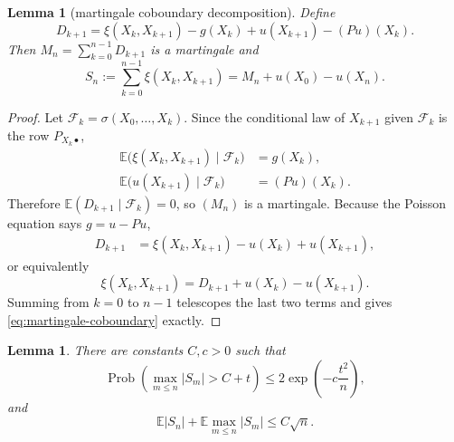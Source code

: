 \documentclass[11pt,a4paper]{amsart}
\newtheorem{lemma}[theorem]{Lemma}
\theoremstyle{definition}
\theoremstyle{remark}
\numberwithin{equation}{section}
\newcommand{\EE}{\mathbb E}
\newcommand{\Prob}{\operatorname{Prob}}
\newcommand{\1}{\boldsymbol 1}
\begin{document}
%
\begin{lemma}[martingale coboundary decomposition]
\label{lem:martingale-coboundary}
Define
\begin{equation}\label{eq:martingale-difference}
 D_{k+1}=\xi(X_k,X_{k+1})-g(X_k)
 +u(X_{k+1})-(Pu)(X_k).
\end{equation}
Then $M_n=\sum_{k=0}^{n-1}D_{k+1}$ is a martingale and
\begin{equation}\label{eq:martingale-coboundary}
 S_n:=\sum_{k=0}^{n-1}\xi(X_k,X_{k+1})
 =M_n+u(X_0)-u(X_n).
\end{equation}
\end{lemma}

\begin{proof}
Let $\mathcal F_k=\sigma(X_0,\ldots,X_k)$.  Since the conditional law
of $X_{k+1}$ given $\mathcal F_k$ is the row
$P_{X_k\bullet}$,
\begin{align*}
 \EE\bigl(\xi(X_k,X_{k+1})\mid\mathcal F_k\bigr)&=g(X_k),\\
 \EE\bigl(u(X_{k+1})\mid\mathcal F_k\bigr)&=(Pu)(X_k).
\end{align*}
Therefore $\EE(D_{k+1}\mid\mathcal F_k)=0$, so $(M_n)$ is a
martingale.  Because the Poisson equation says $g=u-Pu$,
\begin{align*}
 D_{k+1}
 &=\xi(X_k,X_{k+1})-u(X_k)+u(X_{k+1}),
\end{align*}
or equivalently
$$
 \xi(X_k,X_{k+1})
 =D_{k+1}+u(X_k)-u(X_{k+1}).
$$
Summing from $k=0$ to $n-1$ telescopes the last two terms and gives
\eqref{eq:martingale-coboundary} exactly.
\end{proof}

\begin{lemma}%
\label{lem:diffusion}
There are constants \(C,c>0\) such that
\begin{equation}\label{eq:diffusion-tail}
 \Prob\left(\max_{m\le n}|S_m|>C+t\right)
 \le2\exp\left(-c\frac{t^2}{n}\right),
\end{equation}
and
\begin{equation}\label{eq:diffusion-mean}
 \EE|S_n|+\EE\max_{m\le n}|S_m|\le C\sqrt n.
\end{equation}
\end{lemma}
\end{document}
